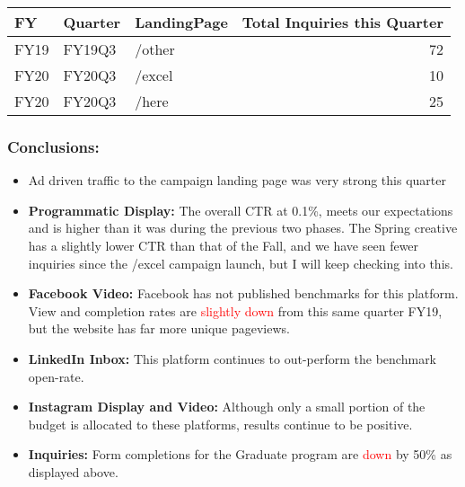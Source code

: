\documentclass[
  11pt,
]{article}
\begin{document}
\begin{tabular}{l|l|l|r}
\hline
FY & Quarter & LandingPage & Total Inquiries this Quarter\\
\hline
FY19 & FY19Q3 & /other & 72\\
\hline
FY20 & FY20Q3 & /excel & 10\\
\hline
FY20 & FY20Q3 & /here & 25\\
\hline
\end{tabular}

\hypertarget{conclusions}{%
\subsubsection{Conclusions:}\label{conclusions}}

\begin{itemize}
\item
  Ad driven traffic to the campaign landing page was very strong this
  quarter
\item
  \textbf{Programmatic Display: } The overall CTR at 0.1\%, meets our
  expectations and is higher than it was during the previous two phases.
  The Spring creative has a slightly lower CTR than that of the Fall,
  and we have seen fewer inquiries since the /excel campaign launch, but
  I will keep checking into this.
\item
  \textbf{Facebook Video:} Facebook has not published benchmarks for
  this platform. View and completion rates are
  \textcolor{red}{slightly down} from this same quarter FY19, but the
  website has far more unique pageviews.
\item
  \textbf{LinkedIn Inbox:} This platform continues to out-perform the
  benchmark open-rate.
\item
  \textbf{Instagram Display and Video:} Although only a small portion of
  the budget is allocated to these platforms, results continue to be
  positive.
\item
  \textbf{Inquiries:} Form completions for the Graduate program are
  \textcolor{red}{down} by 50\% as displayed above.
\end{itemize}
\end{document}
